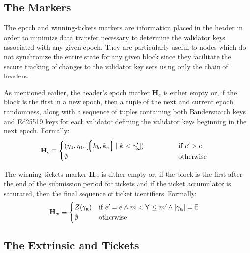 \subsection{The Markers}\label{sec:epochmarker}

The epoch and winning-tickets markers are information placed in the header in order to minimize data transfer necessary to determine the validator keys associated with any given epoch. They are particularly useful to nodes which do not synchronize the entire state for any given block since they facilitate the secure tracking of changes to the validator key sets using only the chain of headers.

As mentioned earlier, the header's epoch marker $\mathbf{H}_e$ is either empty or, if the block is the first in a new epoch, then a tuple of the next and current epoch randomness, along with a sequence of tuples containing both Bandersnatch keys and Ed25519 keys for each validator defining the validator keys beginning in the next epoch. Formally:
\begin{align}\label{eq:epochmarker}
  \mathbf{H}_e &\equiv \begin{cases}
    ( \eta_0, \eta_1, [ \tup{k_b, k_e} \mid k \orderedin \gamma'_\mathbf{k} ] )\qquad\qquad &\when e' > e \\
    \none & \otherwise
  \end{cases}
\end{align}

The winning-tickets marker $\mathbf{H}_w$ is either empty or, if the block is the first after the end of the submission period for tickets and if the ticket accumulator is saturated, then the final sequence of ticket identifiers. Formally:
\begin{align}\label{eq:winningticketsmarker}
  \mathbf{H}_w &\equiv \begin{cases}
    Z(\gamma_\mathbf{a}) &\text{if } e' = e \wedge m < \mathsf{Y} \le m' \wedge |\gamma_\mathbf{a}| = \mathsf{E} \\
    \emptyset & \text{otherwise}
  \end{cases}
\end{align}













\subsection{The Extrinsic and Tickets}

